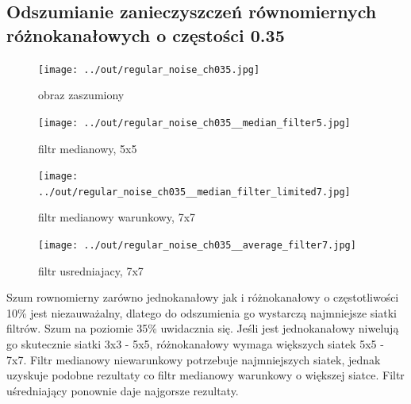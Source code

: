 \documentclass[a4paper,12pt]{article}
\begin{document}
\newpage
\subsection{Odszumianie zanieczyszczeń równomiernych różnokanałowych o częstości 0.35}
\begin{figure}[h!]
\begin{minipage}[t]{7.5cm}
\begin{center}
\texttt{[image: ../out/regular\_noise\_ch035.jpg]}
\caption{obraz zaszumiony}
\end{center}
\end{minipage}
\hfill
\begin{minipage}[t]{7.5cm}
\begin{center}
\texttt{[image: ../out/regular\_noise\_ch035\_\_median\_filter5.jpg]}
\caption{filtr medianowy, 5x5}
\end{center}
\end{minipage}
\end{figure}

\begin{figure}[h!]
\begin{minipage}[t]{7.5cm}
\begin{center}
\texttt{[image: ../out/regular\_noise\_ch035\_\_median\_filter\_limited7.jpg]}
\caption{filtr medianowy warunkowy, 7x7}
\end{center}
\end{minipage}
\hfill
\begin{minipage}[t]{7.5cm}
\begin{center}
\texttt{[image: ../out/regular\_noise\_ch035\_\_average\_filter7.jpg]}
\caption{filtr usredniajacy, 7x7}
\end{center}
\end{minipage}
\end{figure}

Szum rownomierny zarówno jednokanałowy jak i różnokanałowy o częstotliwości 10\% jest niezauważalny, dlatego do odszumienia go wystarczą najmniejsze siatki filtrów. Szum na poziomie 35\% uwidacznia się. Jeśli jest jednokanałowy niwelują go skutecznie siatki 3x3 - 5x5, różnokanałowy wymaga większych siatek 5x5 - 7x7. Filtr medianowy niewarunkowy potrzebuje najmniejszych siatek, jednak uzyskuje podobne rezultaty co filtr medianowy warunkowy o większej siatce. Filtr uśredniający ponownie daje najgorsze rezultaty. 
\end{document}
